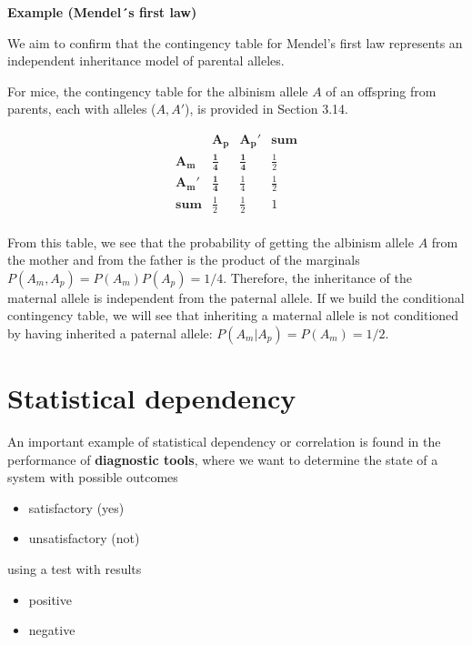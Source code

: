 \documentclass[
]{book}
\providecommand{\tightlist}{%
  \setlength{\itemsep}{0pt}\setlength{\parskip}{0pt}}
\begin{document}
\textbf{Example (Mendel´s first law)}

We aim to confirm that the contingency table for Mendel's first law represents an independent inheritance model of parental alleles.

For mice, the contingency table for the albinism allele \(A\) of an offspring from parents, each with alleles (\(A, A'\)), is provided in Section 3.14.

\[
\begin{array}{ccc|c}
 & \mathbf{A_p} & \mathbf{A_p'} & \mathbf{sum} \\
\mathbf{A_m} & \mathbf{\frac{1}{4}} & \mathbf{\frac{1}{4}} & \frac{1}{2} \\
\mathbf{A_m'} & \mathbf{\frac{1}{4}} & \frac{1}{4} & \frac{1}{2} \\ \hline
\mathbf{sum} & \frac{1}{2} & \frac{1}{2} & 1 \\
\end{array}
\]

From this table, we see that the probability of getting the albinism allele \(A\) from the mother and from the father is the product of the marginals \(P(A_m, A_p)=P(A_m)P(A_p)=1/4\). Therefore, the inheritance of the maternal allele is independent from the paternal allele. If we build the conditional contingency table, we will see that inheriting a maternal allele is not conditioned by having inherited a paternal allele: \(P(A_m| A_p)=P(A_m)=1/2\).

\hypertarget{statistical-dependency}{%
\section{Statistical dependency}\label{statistical-dependency}}

An important example of statistical dependency or correlation is found in the performance of \textbf{diagnostic tools}, where we want to determine the state of a system with possible outcomes

\begin{itemize}
\tightlist
\item
  satisfactory (yes)
\item
  unsatisfactory (not)
\end{itemize}

using a test with results

\begin{itemize}
\tightlist
\item
  positive
\item
  negative
\end{itemize}
\end{document}
